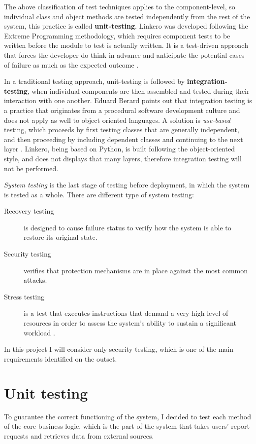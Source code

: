The above classification of test techniques applies to the component-level, so
individual class and object methods are tested independently from the rest of
the system, this practice is called \textbf{unit-testing}. Linkero was developed
following the Extreme Programming methodology, which requires component tests to
be written before the module to test is actually written. It is a test-driven
approach that forces the developer do think in advance and anticipate the
potential cases of failure as much as the expected outcome \cite{VV08}.

In a traditional testing approach, unit-testing is followed by
\textbf{integration-testing}, when individual components are then assembled and
tested during their interaction with one another. Eduard Berard points out that
integration testing is a practice that originates from a procedural software
development culture and does not apply as well to object oriented languages. A
solution is \emph{use-based} testing, which proceeds by first testing classes
that are generally independent, and then proceeding by including dependent
classes and continuing to the next layer \cite{EB93}. Linkero, being based on
Python, is built following the object-oriented style, and does not displays that
many layers, therefore integration testing will not be performed.

\emph{System testing} is the last stage of testing before deployment, in which
the system is tested as a whole. There are different type of system testing:
\begin{description}
\item[Recovery testing] is designed to cause failure status to verify how the
system is able to restore its original state.
\item[Security testing] verifies that protection mechanisms are in place against
the most common attacks.
\item[Stress testing] is a test that executes instructions that demand a very
high level of resources in order to assess the system's ability to sustain a
significant workload \cite{RP05}.
\end{description}

In this project I will consider only security testing, which is one of the main
requirements identified on the outset.


\section{Unit testing}
To guarantee the correct functioning of the system, I decided to test each
method of the core business logic, which is the part of the system that takes
users' report requests and retrieves data from external sources.

